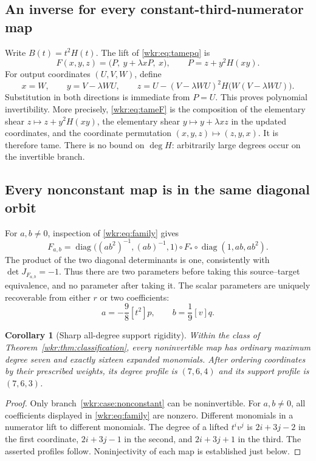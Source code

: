 \documentclass[11pt,a4paper]{article}
\numberwithin{equation}{section}
\newtheorem{corollary}[theorem]{Corollary}
\theoremstyle{definition}
\theoremstyle{remark}
\newcommand{\diag}{\operatorname{diag}}
\newcommand{\coeff}[2]{[#1]#2}
\begin{document}
\subsection{An inverse for every constant-third-numerator map}

Write $B(t)=t^2H(t)$. The lift of \eqref{wkr:eq:tamepq} is
\begin{equation}\label{wkr:eq:tameF}
F(x,y,z)=\bigl(P,\ y+\lambda xP,\ x\bigr),\qquad
P=z+y^2H(xy).
\end{equation}
For output coordinates $(U,V,W)$, define
\begin{equation}\label{wkr:eq:tameinverse}
 x=W,\qquad y=V-\lambda WU,\qquad
 z=U-(V-\lambda WU)^2H\bigl(W(V-\lambda WU)\bigr).
\end{equation}
Substitution in both directions is immediate from $P=U$. This proves
polynomial invertibility. More precisely, \eqref{wkr:eq:tameF} is the
composition of the elementary shear
$z\mapsto z+y^2H(xy)$, the elementary shear $y\mapsto y+\lambda xz$ in the
updated coordinates, and the coordinate permutation
$(x,y,z)\mapsto(z,y,x)$. It is therefore tame. There is no bound on
$\deg H$: arbitrarily large degrees occur on the invertible branch.

\subsection{Every nonconstant map is in the same diagonal orbit}

For $a,b\ne0$, inspection of \eqref{wkr:eq:family} gives
\begin{equation}\label{wkr:eq:diagonal}
F_{a,b}=\diag\bigl((ab^2)^{-1},(ab)^{-1},1\bigr)
\circ F_*\circ\diag(1,ab,ab^2).
\end{equation}
The product of the two diagonal determinants is one, consistently with
$\det J_{F_{a,b}}=-1$. Thus there are two parameters before taking this
source--target equivalence, and no parameter after taking it. The scalar
parameters are uniquely recoverable from either $r$ or two coefficients:
\begin{equation}\label{wkr:eq:coeffrecover}
a=-\frac98\coeff{t^2}{p},\qquad
b=\frac19\coeff{v}{q}.
\end{equation}

\begin{corollary}[Sharp all-degree support rigidity]\label{wkr:cor:support}
Within the class of Theorem~\ref{wkr:thm:classification}, every noninvertible
map has ordinary maximum degree seven and exactly sixteen expanded
monomials. After ordering coordinates by their prescribed weights, its
degree profile is $(7,6,4)$ and its support profile is $(7,6,3)$.
\end{corollary}
\begin{proof}
Only branch~\ref{wkr:case:nonconstant} can be noninvertible. For $a,b\ne0$,
all coefficients displayed in \eqref{wkr:eq:family} are nonzero. Different
monomials in a numerator lift to different monomials. The degree of a lifted
$t^iv^j$ is $2i+3j-2$ in the first coordinate, $2i+3j-1$ in the second,
and $2i+3j+1$ in the third. The asserted profiles follow. Noninjectivity of
each map is established just below.
\end{proof}
\end{document}
